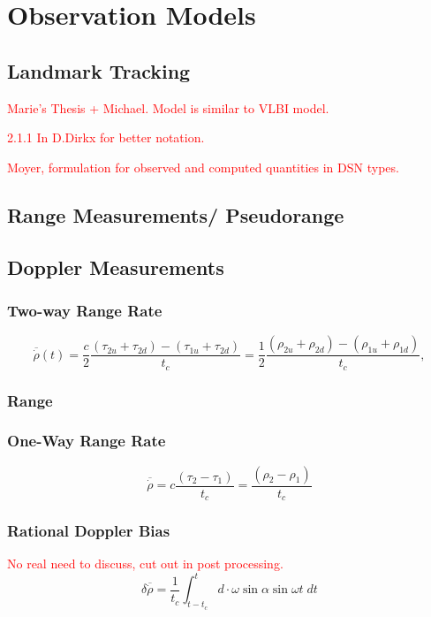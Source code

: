 
\newpage{}
\section{Observation Models}

\subsection{Landmark Tracking}
\textcolor{red}{Marie's Thesis + Michael. Model is similar to VLBI model.}

\textcolor{red}{2.1.1 In D.Dirkx for better notation.}

\textcolor{red}{Moyer, formulation for observed and computed quantities in DSN types.}
\subsection{Range Measurements/ Pseudorange}


\subsection{Doppler Measurements}

\subsubsection{Two-way Range Rate}
\begin{equation}
    \overline{\dot{\rho}}(t) = \frac{c}{2}\frac{(\tau_{2u}+\tau_{2d})-(\tau_{1u}+\tau_{2d})}{t_c} = \frac{1}{2}\frac{(\rho_{2u}+\rho_{2d})-(\rho_{1u} + \rho_{1d})}{t_c},
\end{equation}

\subsubsection{Range}

\subsubsection{One-Way Range Rate}
\begin{equation}
    \overline{\dot{\rho}} = c\frac{(\tau_2-\tau_1)}{t_c}=\frac{(\rho_2-\rho_1)}{t_c} 
\end{equation}

\subsubsection{Rational Doppler Bias}
\textcolor{red}{No real need to discuss, cut out in post processing.}
\begin{equation}
    \delta\overline{\dot{\rho}} = \frac{1}{t_c}\int_{t-t_c}^{t}d\cdot{\omega\sin{\alpha}\sin{\omega{t}}\;dt}
\end{equation}

